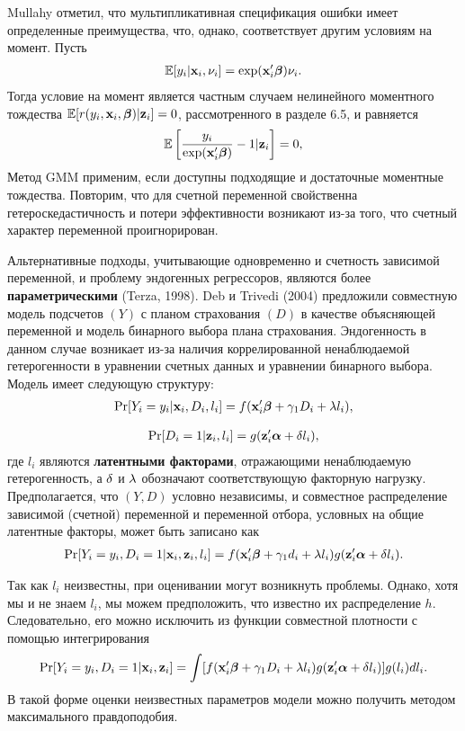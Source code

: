 Mullahy отметил, что мультипликативная спецификация ошибки имеет определенные преимущества, что, однако, соответствует другим условиям на момент. Пусть
    \begin{align}\label{eq:20.29}
    \mathbb{E}[y_i|\mathbf{x}_i, \nu_i] = \exp(\mathbf{x}_i'\bm{\beta})\nu_i.
    \end{align}
Тогда условие на момент является частным случаем нелинейного моментного тождества $\mathbb{E}[r(y_i, \mathbf{x}_i, \bm{\beta})|\mathbf{z}_i] = 0$, рассмотренного в разделе 6.5, и равняется
    \begin{align}\label{eq:20.30}
    \mathbb{E}\left[ \frac{y_i}{\exp(\mathbf{x}_i'\bm{\beta})} - 1| \mathbf{z}_i \right] = 0,
    \end{align}
Метод GMM применим, если доступны подходящие и достаточные моментные тождества. Повторим, что для счетной переменной свойственна гетероскедастичность и потери эффективности возникают из-за того, что счетный характер переменной проигнорирован.

Альтернативные подходы, учитывающие одновременно и счетность зависимой переменной, и проблему эндогенных регрессоров, являются более \textbf{параметрическими} (Terza, 1998). Deb и Trivedi (2004) предложили совместную модель подсчетов $(Y)$ с планом страхования $(D)$ в качестве объясняющей переменной и модель бинарного выбора плана страхования. Эндогенность в данном случае возникает из-за наличия коррелированной ненаблюдаемой гетерогенности в уравнении счетных данных и уравнении бинарного выбора.
Модель имеет следующую структуру:
    \begin{align}\label{eq:20.31}
    \mathrm{Pr}[Y_i = y_i|\mathbf{x}_i, D_i, l_i] = f(\mathbf{x}_i'\bm{\beta} + \gamma_1 D_i + \lambda l_i),
    \end{align}

    \begin{align}\label{eq:20.32}
    \mathrm{Pr}[D_i = 1|\mathbf{z}_i, l_i] = g(\mathbf{z}'_i \bm{\alpha} + \delta l_i),
    \end{align}
где $l_i$ являются \textbf{латентными факторами}, отражающими ненаблюдаемую гетерогенность, а $\delta$ и $\lambda$ обозначают соответствующую факторную нагрузку. Предполагается, что $(Y, D)$ условно независимы, и совместное распределение зависимой (счетной) переменной и переменной отбора, условных на общие латентные факторы, может быть записано как
    \begin{align}\label{eq:20.33}
    \mathrm{Pr}[Y_i = y_i, D_i = 1|\mathbf{x}_i, \mathbf{z}_i, l_i] = f(\mathbf{x}_i'\bm{\beta} + \gamma_1 d_i + \lambda l_i) g(\mathbf{z}'_i \bm{\alpha} + \delta l_i).
    \end{align}

Так как $l_i$ неизвестны, при оценивании могут возникнуть проблемы. Однако, хотя мы и не знаем $l_i$, мы можем предположить, что известно их распределение $h$. Следовательно, его можно исключить из функции совместной плотности с помощью интегрирования
    \begin{align}\label{eq:20.34}
    \mathrm{Pr}[Y_i = y_i, D_i = 1|\mathbf{x}_i, \mathbf{z}_i] = \int [f(\mathbf{x}_i'\bm{\beta} + \gamma_1 D_i + \lambda l_i)g(\mathbf{z}'_i\bm{\alpha} + \delta l_i)]g(l_i)dl_i.
    \end{align}
В такой форме оценки неизвестных параметров модели можно получить методом максимального правдоподобия.

